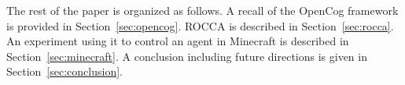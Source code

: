 \documentclass[runningheads]{llncs}
\begin{document}









The rest of the paper is organized as follows.  A recall of the
OpenCog framework is provided in Section~\ref{sec:opencog}.  ROCCA is
described in Section~\ref{sec:rocca}.  An experiment using it to
control an agent in Minecraft is described in
Section~\ref{sec:minecraft}.  A conclusion including future directions
is given in Section~\ref{sec:conclusion}.
\end{document}
